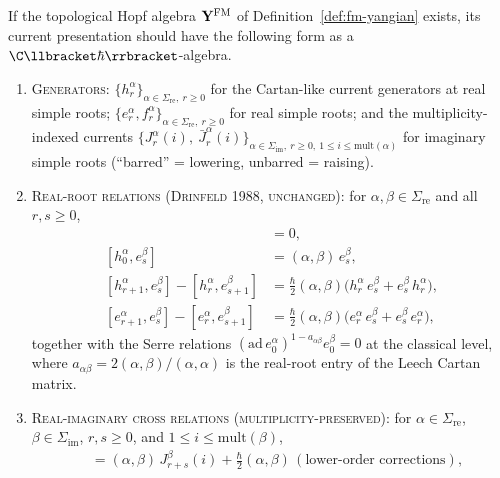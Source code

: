 \begin{conjecture}
\label{thm:fm-drinfeld-j}
\ClaimStatusConjectured
{}
If the topological Hopf algebra $\mathbf{Y}^{\mathrm{FM}}$ of Definition~\ref{def:fm-yangian}
exists, its current presentation should have the following form as a
$\C\llbracket\hbar\rrbracket$-algebra.
\begin{enumerate}[label=\textup{(J\arabic*)}]
\item \textsc{Generators}: $\{ h^\alpha_r \}_{\alpha \in \Sigma_{\mathrm{re}},\ r \geq 0}$ for the Cartan-like current generators at real simple roots; $\{ e^\alpha_r, f^\alpha_r \}_{\alpha \in \Sigma_{\mathrm{re}},\ r \geq 0}$ for real simple roots; and the multiplicity-indexed currents $\{ J^\alpha_r(i),\ \bar J^\alpha_r(i) \}_{\alpha \in \Sigma_{\mathrm{im}},\ r \geq 0,\ 1 \leq i \leq \mathrm{mult}(\alpha)}$ for imaginary simple roots (``barred'' = lowering, unbarred = raising).
\item \textsc{Real-root relations (Drinfeld 1988, unchanged)}: for $\alpha, \beta \in \Sigma_{\mathrm{re}}$ and all $r, s \geq 0$,
\begin{align*}
 [h^\alpha_r, h^\beta_s] &= 0, \\
 [h^\alpha_0, e^\beta_s] &= (\alpha, \beta)\, e^\beta_s, \\
 [h^\alpha_{r+1}, e^\beta_s] - [h^\alpha_r, e^\beta_{s+1}] &= \tfrac{\hbar}{2}(\alpha, \beta)\bigl(h^\alpha_r\, e^\beta_s + e^\beta_s\, h^\alpha_r\bigr), \\
 [e^\alpha_{r+1}, e^\beta_s] - [e^\alpha_r, e^\beta_{s+1}] &= \tfrac{\hbar}{2}(\alpha, \beta)\bigl(e^\alpha_r\, e^\beta_s + e^\beta_s\, e^\alpha_r\bigr),
\end{align*}
together with the Serre relations $(\mathrm{ad}\, e^\alpha_0)^{1 - a_{\alpha\beta}} e^\beta_0 = 0$ at the classical level, where $a_{\alpha\beta} = 2(\alpha, \beta)/(\alpha, \alpha)$ is the real-root entry of the Leech Cartan matrix.
\item \textsc{Real-imaginary cross relations (multiplicity-preserved)}: for $\alpha \in \Sigma_{\mathrm{re}}$, $\beta \in \Sigma_{\mathrm{im}}$, $r, s \geq 0$, and $1 \leq i \leq \mathrm{mult}(\beta)$,
\begin{align*}
 [h^\alpha_r, J^\beta_s(i)] &= (\alpha, \beta)\, J^\beta_{r + s}(i) + \tfrac{\hbar}{2}(\alpha, \beta)\, (\text{lower-order corrections}), \\

\end{align*}
\end{enumerate}
\end{conjecture}
